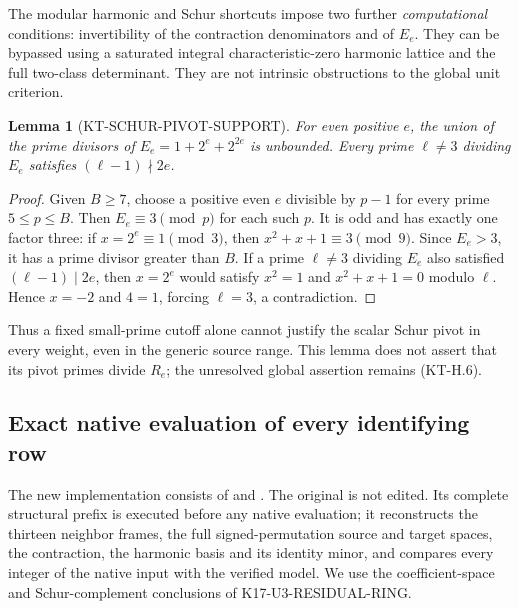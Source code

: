 \documentclass[11pt,a4paper]{article}
\newtheorem{lemma}[theorem]{Lemma}
\theoremstyle{definition}
\begin{document}
The modular harmonic and Schur shortcuts impose two further
\emph{computational} conditions: invertibility of the contraction
denominators and of $E_e$.  They can be bypassed using a saturated
integral characteristic-zero harmonic lattice and the full
two-class determinant.  They are not intrinsic obstructions
to the global unit criterion.

\begin{lemma}[KT-SCHUR-PIVOT-SUPPORT]
For even positive $e$, the union of the prime divisors of
$E_e=1+2^e+2^{2e}$ is unbounded.  Every prime $\ell\ne3$
dividing $E_e$ satisfies $(\ell-1)\nmid2e$.
\end{lemma}
\begin{proof}
Given $B\ge7$, choose a positive even $e$ divisible by $p-1$
for every prime $5\le p\le B$.  Then $E_e\equiv3\pmod p$
for each such $p$.  It is odd and has exactly one factor three:
if $x=2^e\equiv1\pmod3$, then $x^2+x+1\equiv3\pmod9$.
Since $E_e>3$, it has a prime divisor greater than $B$.
If a prime $\ell\ne3$ dividing $E_e$ also satisfied
$(\ell-1)\mid2e$, then $x=2^e$ would satisfy $x^2=1$ and
$x^2+x+1=0$ modulo $\ell$.  Hence $x=-2$ and $4=1$,
forcing $\ell=3$, a contradiction.
\end{proof}

Thus a fixed small-prime cutoff alone cannot justify the scalar
Schur pivot in every weight, even in the generic source range.
This lemma does not assert that its pivot primes divide $R_e$;
the unresolved global assertion remains (KT-H.6).



\subsection{Exact native evaluation of every identifying row}
\label{sec:kt-native-full-rows}

The new implementation consists of
 and
.  The original
 is not edited.  Its complete
structural prefix is executed before any native evaluation; it
reconstructs the thirteen neighbor frames, the full signed-permutation
source and target spaces, the contraction, the harmonic basis and
its identity minor, and compares every integer of the native input
 with the verified model.  We use the coefficient-space
and Schur-complement conclusions of K17-U3-RESIDUAL-RING.
\end{document}
